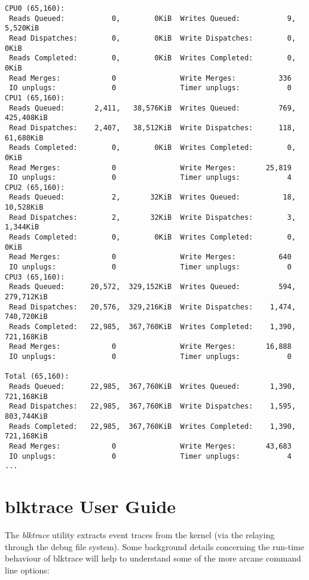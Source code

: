\documentclass{article}
\begin{document}
\begin{verbatim}
CPU0 (65,160):
 Reads Queued:           0,        0KiB  Writes Queued:           9,    5,520KiB
 Read Dispatches:        0,        0KiB  Write Dispatches:        0,        0KiB
 Reads Completed:        0,        0KiB  Writes Completed:        0,        0KiB
 Read Merges:            0               Write Merges:          336
 IO unplugs:             0               Timer unplugs:           0
CPU1 (65,160):
 Reads Queued:       2,411,   38,576KiB  Writes Queued:         769,  425,408KiB
 Read Dispatches:    2,407,   38,512KiB  Write Dispatches:      118,   61,680KiB
 Reads Completed:        0,        0KiB  Writes Completed:        0,        0KiB
 Read Merges:            0               Write Merges:       25,819
 IO unplugs:             0               Timer unplugs:           4
CPU2 (65,160):
 Reads Queued:           2,       32KiB  Writes Queued:          18,   10,528KiB
 Read Dispatches:        2,       32KiB  Write Dispatches:        3,    1,344KiB
 Reads Completed:        0,        0KiB  Writes Completed:        0,        0KiB
 Read Merges:            0               Write Merges:          640
 IO unplugs:             0               Timer unplugs:           0
CPU3 (65,160):
 Reads Queued:      20,572,  329,152KiB  Writes Queued:         594,  279,712KiB
 Read Dispatches:   20,576,  329,216KiB  Write Dispatches:    1,474,  740,720KiB
 Reads Completed:   22,985,  367,760KiB  Writes Completed:    1,390,  721,168KiB
 Read Merges:            0               Write Merges:       16,888
 IO unplugs:             0               Timer unplugs:           0

Total (65,160):
 Reads Queued:      22,985,  367,760KiB  Writes Queued:       1,390,  721,168KiB
 Read Dispatches:   22,985,  367,760KiB  Write Dispatches:    1,595,  803,744KiB
 Reads Completed:   22,985,  367,760KiB  Writes Completed:    1,390,  721,168KiB
 Read Merges:            0               Write Merges:       43,683
 IO unplugs:             0               Timer unplugs:           4
...
\end{verbatim}

\newpage\section{\label{sec:blktrace-ug}blktrace User Guide}

The \emph{blktrace} utility extracts event traces from the kernel (via
the relaying through the debug file system). Some background details
concerning the run-time behaviour of blktrace will help to understand some
of the more arcane command line options:
\end{document}

